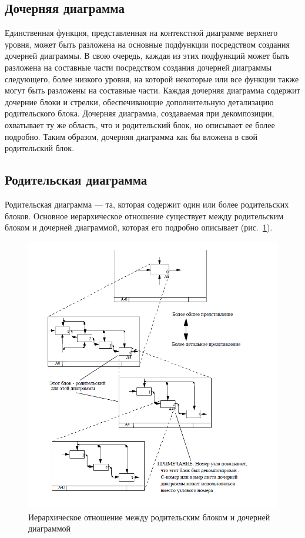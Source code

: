 \documentclass[a4paper, final]{article}
\begin{document}
\subsection{Дочерняя диаграмма}
Единственная функция, представленная на контекстной диаграмме верхнего уровня, может быть разложена на основные подфункции посредством создания дочерней диаграммы. В свою очередь, каждая из этих подфункций может быть разложена на составные части посредством создания дочерней диаграммы следующего, более низкого уровня, на которой некоторые или все функции также могут быть разложены на составные части. Каждая дочерняя диаграмма содержит дочерние блоки и стрелки, обеспечивающие дополнительную детализацию родительского блока. Дочерняя диаграмма, создаваемая при декомпозиции, охватывает ту же область, что и родительский блок, но описывает ее более подробно. Таким образом, дочерняя диаграмма как бы вложена в свой родительский блок. 

\subsection{Родительская диаграмма}
Родительская диаграмма --- та, которая содержит один или более родительских блоков. Основное иерархическое отношение существует между родительским блоком и дочерней диаграммой, которая его подробно описывает (рис.~\ref{img:struct}).

\begin{figure}[H]
  \centering
  \includegraphics[width=0.7\linewidth]{struct.png}
  \caption{Иерархическое отношение между родительским блоком и дочерней диаграммой}
  \label{img:struct}
\end{figure}
\end{document}
